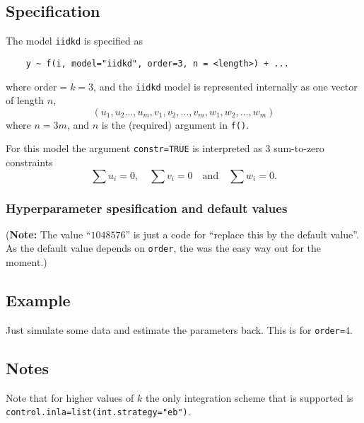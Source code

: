 \documentclass[a4paper,11pt]{article}
\begin{document}
\subsection*{Specification}

The model \texttt{iidkd}
is specified as
\begin{verbatim}
    y ~ f(i, model="iidkd", order=3, n = <length>) + ...
\end{verbatim}
where $\text{order}=k=3$, and the \texttt{iidkd} model is represented
internally as one vector of length $n$,
\begin{displaymath}
    (u_{1}, u_{2} \ldots, u_{m}, v_{1}, v_{2}, \ldots, v_{m}, w_{1},
    w_{2}, \ldots, w_{m})
\end{displaymath}
where $n = 3m$, and $n$ is the (required) argument in
\texttt{f()}.

For this model the argument \texttt{constr=TRUE} is interpreted as $3$
sum-to-zero constraints
\begin{displaymath}
    \sum u_{i} = 0, \quad \sum v_{i} = 0 \quad\text{and}\quad \sum w_{i} = 0.
\end{displaymath}

\subsubsection*{Hyperparameter spesification and default values}

(\textbf{Note:} The value ``$1048576$'' is just a code for ``replace
this by the default value''. As the default value depends on
\texttt{order}, the was the easy way out for the moment.)




\subsection*{Example}

Just simulate some data and estimate the parameters back. This is for
\texttt{order=}$4$.

{\small}

\subsection*{Notes}

Note that for higher values of $k$ the only integration scheme that is
supported is \\
\texttt{control.inla=list(int.strategy="eb")}.
\end{document}

